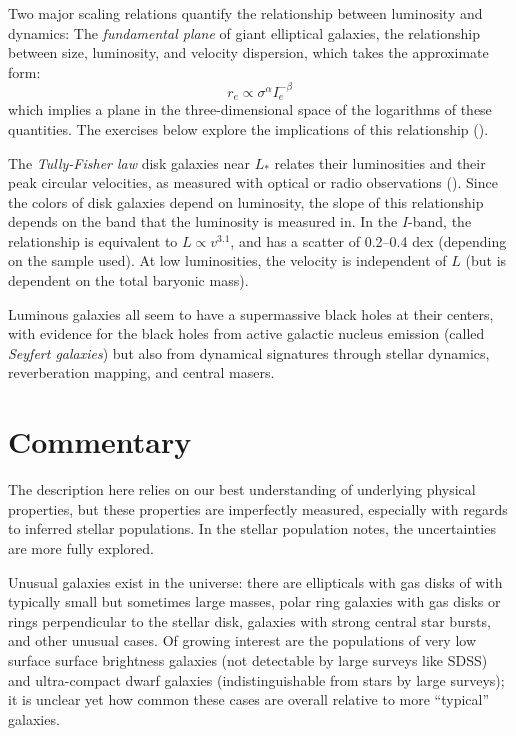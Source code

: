 Two major scaling relations quantify the relationship between
luminosity and dynamics: The {\it fundamental plane} of giant
elliptical galaxies, the relationship between size, luminosity, and
velocity dispersion, which takes the approximate form:
\begin{equation}
\label{eq:fundamentalplane}
r_e \propto \sigma^\alpha I_e^{-\beta}
\end{equation}
which implies a plane in the three-dimensional space of the logarithms
of these quantities. The exercises below explore the implications of
this relationship (\citealt{bender92a}).

The {\it Tully-Fisher law} disk galaxies near $L_\ast$ relates their
luminosities and their peak circular velocities, as measured with
optical or radio observations (\citealt{tully77a}). Since the colors
of disk galaxies depend on luminosity, the slope of this relationship
depends on the band that the luminosity is measured in. In the
$I$-band, the relationship is equivalent to $L\propto v^{3.1}$, and
has a scatter of 0.2--0.4 dex (depending on the sample used). At low
luminosities, the velocity is independent of $L$ (but is dependent on
the total baryonic mass).

Luminous galaxies all seem to have a supermassive black holes at their
centers, with evidence for the black holes from active galactic
nucleus emission (called {\it Seyfert galaxies}) but also from
dynamical signatures through stellar dynamics, reverberation mapping,
and central masers.

\section{Commentary}

The description here relies on our best understanding of underlying
physical properties, but these properties are imperfectly measured,
especially with regards to inferred stellar populations. In the
stellar population notes, the uncertainties are more fully explored.

Unusual galaxies exist in the universe: there are ellipticals with gas
disks of with typically small but sometimes large masses, polar ring
galaxies with gas disks or rings perpendicular to the stellar disk,
galaxies with strong central star bursts, and other unusual cases. Of
growing interest are the populations of very low surface surface
brightness galaxies (not detectable by large surveys like SDSS) and
ultra-compact dwarf galaxies (indistinguishable from stars by large
surveys); it is unclear yet how common these cases are overall
relative to more ``typical'' galaxies.

